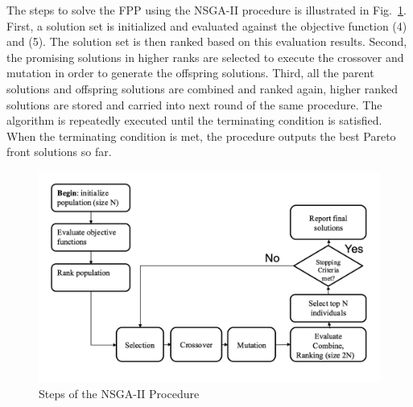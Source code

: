 \documentclass[10pt,journal,compsoc]{IEEEtran}
\newcommand{\Fig}[1]{Fig.~\ref{#1}}
\begin{document}
The steps to solve the FPP using the NSGA-II procedure is illustrated in \Fig{nsgaflowchart}. First, a solution set is initialized and evaluated against the objective function (4) and (5). The solution set is then ranked based on this evaluation results. Second, the promising solutions in higher ranks are selected to execute the crossover and mutation in order to generate the offspring solutions. Third, all the parent solutions and offspring solutions are combined and ranked again, higher ranked solutions are stored and carried into next round of the same procedure. The algorithm is repeatedly executed until the terminating condition is satisfied. When the terminating condition is met, the procedure outputs the best Pareto front solutions so far.
\begin{figure}[ht]
\centerline{\includegraphics[width=\columnwidth]{nsgaphaseflowchart.png}}
\caption{Steps of the NSGA-II Procedure} 
\label{nsgaflowchart}
\end{figure}

\end{document}
